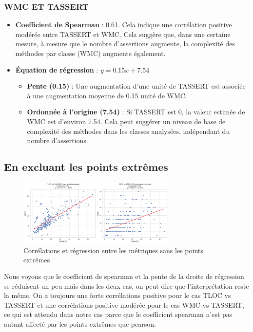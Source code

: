 \documentclass[10pt]{article}
\begin{document}
\subsubsection{WMC ET TASSERT}
\begin{itemize}
    \item \textbf{Coefficient de Spearman} : 0.61. Cela indique une corrélation positive modérée entre TASSERT et WMC. Cela suggère que, dans une certaine mesure, à mesure que le nombre d'assertions augmente, la complexité des méthodes par classe (WMC) augmente également.
    \item \textbf{Équation de régression} : \( y = 0.15x + 7.54 \)
    \begin{itemize}
        \item \textbf{Pente (0.15)} : Une augmentation d'une unité de TASSERT est associée à une augmentation moyenne de 0.15 unité de WMC.
        \item \textbf{Ordonnée à l'origine (7.54)} : Si TASSERT est 0, la valeur estimée de WMC est d'environ 7.54. Cela peut suggérer un niveau de base de complexité des méthodes dans les classes analysées, indépendant du nombre d'assertions.
    \end{itemize}
\end{itemize}

\subsection{En excluant les points extrêmes}

\begin{figure}[h]
\centering
\includegraphics[width=0.7\textwidth]{correlations-no-outliers.png}
\caption{Corrélations et régression entre les métriques sans les points extrêmes}
\end{figure}

Nous voyons que le coefficient de spearman et la pente de la droite de régression se réduisent un peu mais dans les deux cas, on peut dire que l'interprétation reste la même. On a toujours une forte corrélations positive pour le cas TLOC vs TASSERT et une corrélations positive modérée pour le cas WMC vs TASSERT, ce qui est attendu dans notre cas parce que le coefficient spearman n'est pas autant affecté par les points extrêmes que pearson.
\end{document}

